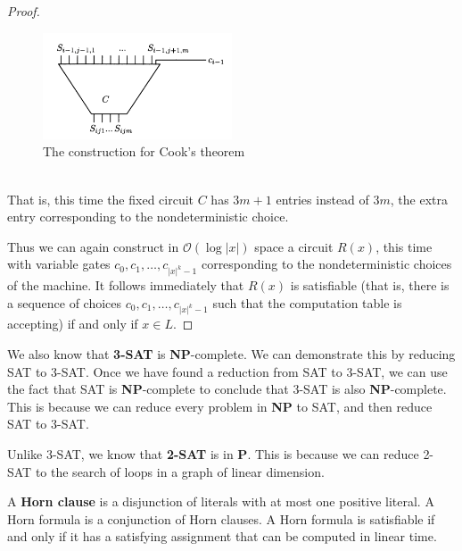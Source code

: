 \documentclass[12pt]{article}
\begin{document}
\begin{proof}
\begin{figure}[h]
  \centering
  \includegraphics[width=0.5\textwidth]{img/cook2.png}
  \caption{The construction for Cook's theorem}
\end{figure}
\\
That is, this time the fixed circuit $C$ has $3m + 1$ entries instead of $3m$, the extra entry corresponding to the nondeterministic choice.

Thus we can again construct in $\mathcal{O}(\log |x|)$ space a circuit $R(x)$, this time with variable gates $c_0, c_1, \ldots, c_{|x|^k - 1}$ corresponding to the nondeterministic choices of the machine. It follows immediately that $R(x)$ is satisfiable (that is, there is a sequence of choices $c_0, c_1, \ldots, c_{|x|^k - 1}$ such that the computation table is accepting) if and only if $x \in L$.

\end{proof}
\begin{defbox}
  We also know that \textbf{3-SAT} is \textbf{NP}-complete. We can demonstrate this by reducing \textsc{SAT} to \textsc{3-SAT}. Once we have found a reduction from \textsc{SAT} to \textsc{3-SAT}, we can use the fact that \textsc{SAT} is \textbf{NP}-complete to conclude that \textsc{3-SAT} is also \textbf{NP}-complete. This is because we can reduce every problem in \textbf{NP} to \textsc{SAT}, and then reduce \textsc{SAT} to \textsc{3-SAT}.
\end{defbox}
\begin{defbox}[2-SAT is in P]
  Unlike 3-SAT, we know that \textbf{2-SAT} is in \textbf{P}. This is because we can reduce \textsc{2-SAT} to the search of loops in a graph of linear dimension.
\end{defbox}
\begin{defbox}
  A \textbf{Horn clause} is a disjunction of literals with at most one positive literal. A Horn formula is a conjunction of Horn clauses. A Horn formula is satisfiable if and only if it has a satisfying assignment that can be computed in linear time.
\end{defbox}
\end{document}
